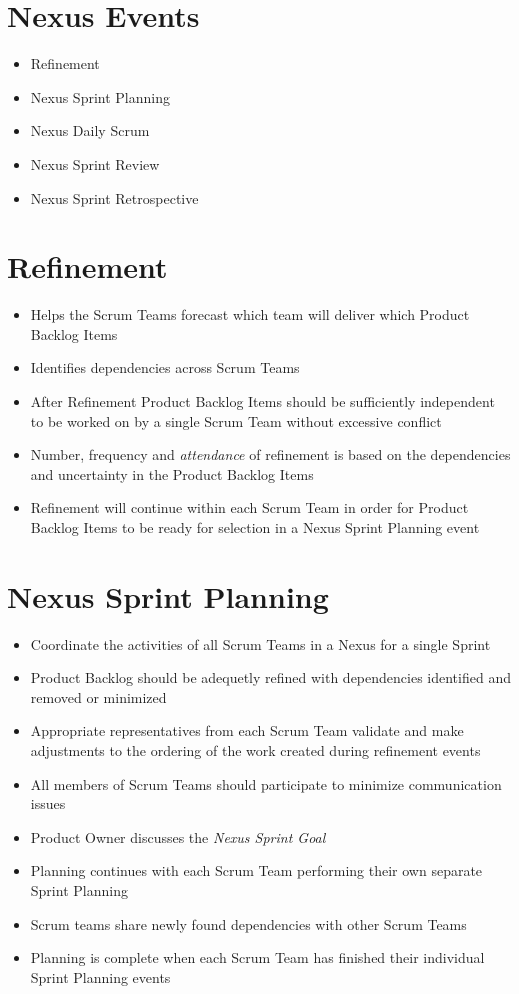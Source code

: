 \documentclass[a4paper,11pt,twocolumn]{article}
\begin{document}
\section*{Nexus Events}
\begin{itemize}
	\item Refinement
	\item Nexus Sprint Planning
	\item Nexus Daily Scrum
	\item Nexus Sprint Review
	\item Nexus Sprint Retrospective
\end{itemize}

\section*{Refinement}
\begin{itemize}
	\item Helps the Scrum Teams forecast which team will deliver which Product Backlog Items
	\item Identifies dependencies across Scrum Teams
	\item After Refinement Product Backlog Items should be sufficiently independent to be worked on by a single Scrum Team without excessive conflict
	\item Number, frequency and \textit{attendance} of refinement is based on the dependencies and uncertainty in the Product Backlog Items
	\item Refinement will continue within each Scrum Team in order for Product Backlog Items to be ready for selection in a Nexus Sprint Planning event
\end{itemize}

\section*{Nexus Sprint Planning}
\begin{itemize}
	\item Coordinate the activities of all Scrum Teams in a Nexus for a single Sprint
	\item Product Backlog should be adequetly refined with dependencies identified and removed or minimized
	\item Appropriate representatives from each Scrum Team validate and make adjustments to the ordering of the work created during refinement events
	\item All members of Scrum Teams should participate to minimize communication issues
	\item Product Owner discusses the \textit{Nexus Sprint Goal}
	\item Planning continues with each Scrum Team performing their own separate Sprint Planning
	\item Scrum teams share newly found dependencies with other Scrum Teams
	\item Planning is complete when each Scrum Team has finished their individual Sprint Planning events
\end{itemize}
\end{document}
